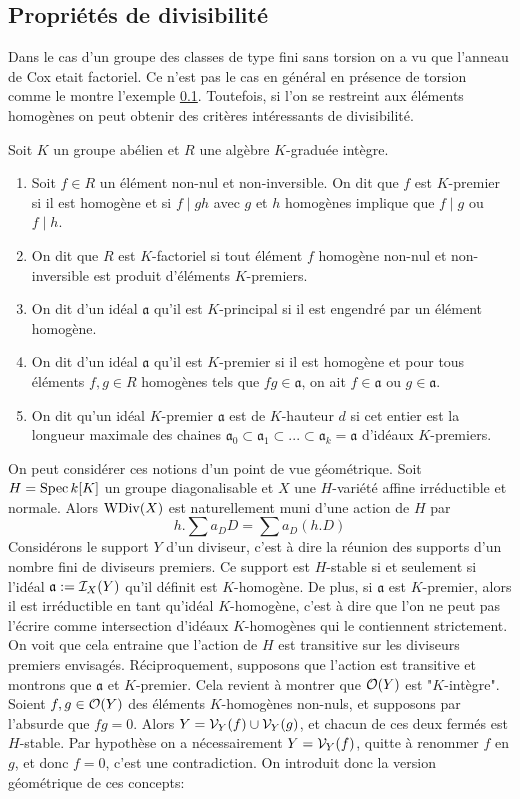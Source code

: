 \subsection{Propriétés de divisibilité}

Dans le cas d'un groupe des classes de type fini sans torsion on a vu que l'anneau de Cox etait factoriel. Ce n'est pas le cas en général en présence de torsion comme le montre l'exemple \ref{}. Toutefois, si l'on se restreint aux éléments homogènes on peut obtenir des critères intéressants de divisibilité. 

\begin{defn}
Soit $K$ un groupe abélien et $R$ une algèbre $K$-graduée intègre.
\begin{enumerate}
\item Soit $f\in R$ un élément non-nul et non-inversible. On dit que $f$ est $K$-premier si il est homogène et si $f\mid gh$ avec $g$ et $h$ homogènes implique que $f\mid g$ ou $f\mid h$.
\item On dit que $R$ est $K$-factoriel si tout élément $f$ homogène non-nul et non-inversible est produit d'éléments $K$-premiers.
\item On dit d'un idéal $\mathfrak{a}$ qu'il est $K$-principal si il est engendré par un élément homogène.
\item On dit d'un idéal $\mathfrak{a}$ qu'il est $K$-premier si il est homogène et pour tous éléments $f,g\in R$ homogènes tels que $fg\in\mathfrak{a}$, on ait $f\in\mathfrak{a}$ ou $g\in\mathfrak{a}$.
\item On dit qu'un idéal $K$-premier $\mathfrak{a}$ est de $K$-hauteur $d$ si cet entier est la longueur maximale des chaines $\mathfrak{a}_0\subset \mathfrak{a}_1\subset ...\subset \mathfrak{a}_k=\mathfrak{a}$ d'idéaux $K$-premiers.
\end{enumerate}
\end{defn}

On peut considérer ces notions d'un point de vue géométrique. Soit $H=\operatorname{Spec} k[K]$ un groupe diagonalisable et $X$ une $H$-variété affine irréductible et normale. Alors $\operatorname{WDiv}(X)$ est naturellement muni d'une action de $H$ par 
$$h.\sum a_DD=\sum a_D(h.D)$$
Considérons le support $Y$ d'un diviseur, c'est à dire la réunion des supports d'un nombre fini de diviseurs premiers. Ce support est $H$-stable si et seulement si l'idéal $\mathfrak{a}:=\mathcal{I}_X(Y)$ qu'il définit est $K$-homogène. De plus, si $\mathfrak{a}$ est $K$-premier, alors il est irréductible en tant qu'idéal $K$-homogène, c'est à dire que l'on ne peut pas l'écrire comme intersection d'idéaux $K$-homogènes qui le contiennent strictement. On voit que cela entraine que l'action de $H$ est transitive sur les diviseurs premiers envisagés. Réciproquement, supposons que l'action est transitive et montrons que $\mathfrak{a}$ et $K$-premier. Cela revient à montrer que $\mathcal{O}(Y)$ est "$K$-intègre". Soient $f,g\in \mathcal{O}(Y)$ des éléments $K$-homogènes non-nuls, et supposons par l'absurde que $fg=0$. Alors $Y=\mathcal{V}_Y(f)\cup\mathcal{V}_Y(g)$, et chacun de ces deux fermés est $H$-stable. Par hypothèse on a nécessairement $Y=\mathcal{V}_Y(f)$, quitte à renommer $f$ en $g$, et donc $f=0$, c'est une contradiction. On introduit donc la version géométrique de ces concepts:

